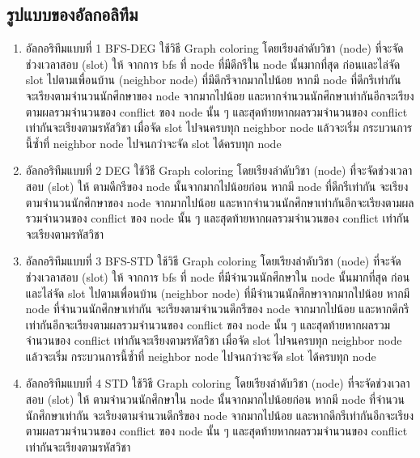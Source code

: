 \subsection{รูปแบบของอัลกอลิทึม}
\begin{enumerate}
  \item อัลกอริทึมแบบที่ 1 BFS-DEG ใช้วิธี Graph coloring โดยเรียงลำดับวิชา (node) ที่จะจัดช่วงเวลาสอบ (slot) ให้ จากการ bfs ที่ node ที่มีดีกรีใน node นั้นมากที่สุด
  ก่อนและไล่จัด slot ไปตามเพื่อนบ้าน (neighbor node) ที่มีดีกรีจากมากไปน้อย หากมี node ที่ดีกรีเท่ากัน จะเรียงตามจำนวนนักศึกษาของ node จากมากไปน้อย และหากจำนวนนักศึกษาเท่ากันอีกจะเรียงตามผลรวมจำนวนของ conflict ของ node นั้น ๆ 
  และสุดท้ายหากผลรวมจำนวนของ conflict เท่ากันจะเรียงตามรหัสวิชา เมื่อจัด slot ไปจนครบทุก neighbor node แล้วจะเริ่ม กระบวนการนี้ซ้ำที่ neighbor node ไปจนกว่าจะจัด slot ได้ครบทุก node
  \item อัลกอริทึมแบบที่ 2 DEG ใช้วิธี Graph coloring โดยเรียงลำดับวิชา (node) ที่จะจัดช่วงเวลาสอบ (slot) ให้ ตามดีกรีของ node นั้นจากมากไปน้อยก่อน
  หากมี node ที่ดีกรีเท่ากัน จะเรียงตามจำนวนนักศึกษาของ node จากมากไปน้อย และหากจำนวนนักศึกษาเท่ากันอีกจะเรียงตามผลรวมจำนวนของ conflict ของ node นั้น ๆ 
  และสุดท้ายหากผลรวมจำนวนของ conflict เท่ากันจะเรียงตามรหัสวิชา
  \item อัลกอริทึมแบบที่ 3 BFS-STD ใช้วิธี Graph coloring โดยเรียงลำดับวิชา (node) ที่จะจัดช่วงเวลาสอบ (slot) ให้ จากการ bfs ที่ node ที่มีจำนวนนักศึกษาใน node นั้นมากที่สุด
  ก่อนและไล่จัด slot ไปตามเพื่อนบ้าน (neighbor node) ที่มีจำนวนนักศึกษาจากมากไปน้อย หากมี node ที่จำนวนนักศึกษาเท่ากัน จะเรียงตามจำนวนดีกรีของ node จากมากไปน้อย และหากดีกรีเท่ากันอีกจะเรียงตามผลรวมจำนวนของ conflict ของ node นั้น ๆ 
  และสุดท้ายหากผลรวมจำนวนของ conflict เท่ากันจะเรียงตามรหัสวิชา เมื่อจัด slot ไปจนครบทุก neighbor node แล้วจะเริ่ม กระบวนการนี้ซ้ำที่ neighbor node ไปจนกว่าจะจัด slot ได้ครบทุก node
  \item อัลกอริทึมแบบที่ 4 STD ใช้วิธี Graph coloring โดยเรียงลำดับวิชา (node) ที่จะจัดช่วงเวลาสอบ (slot) ให้ ตามจำนวนนักศึกษาใน node นั้นจากมากไปน้อยก่อน
  หากมี node ที่จำนวนนักศึกษาเท่ากัน จะเรียงตามจำนวนดีกรีของ node จากมากไปน้อย และหากดีกรีเท่ากันอีกจะเรียงตามผลรวมจำนวนของ conflict ของ node นั้น ๆ 
  และสุดท้ายหากผลรวมจำนวนของ conflict เท่ากันจะเรียงตามรหัสวิชา
  
  
\end{enumerate}

